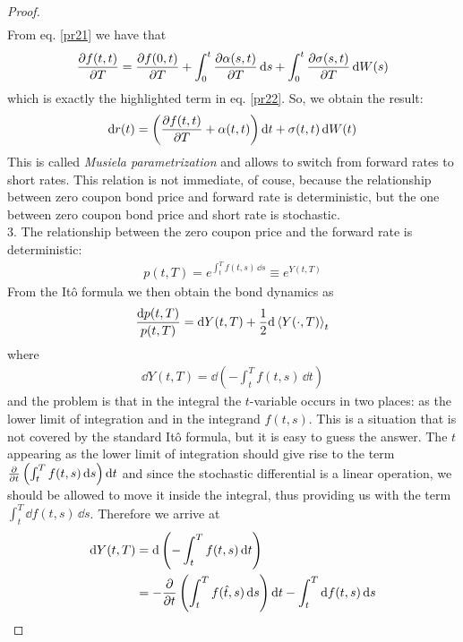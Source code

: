 \begin{proof}
\begin{align*}
    \end{align*}
    From eq. \eqref{pr21} we have that
    \begin{align*}
        \pdv{f(t,t)}{T} = \pdv{f(0,t)}{T} + \int_0^t \pdv{\alpha(s,t)}{T}\,\dd s + \int_0^t \pdv{\sigma(s,t)}{T}\,\dd W(s)
    \end{align*}
    which is exactly the highlighted term in eq. \eqref{pr22}. So, we obtain the result:
    \begin{align*}
        \dd r(t) = \left(\pdv{f(t,t)}{T} + \alpha(t,t)\right)\dd t + \sigma(t,t)\,\dd W(t)
    \end{align*}
    This is called \emph{Musiela parametrization} and allows to switch from forward rates to short rates. This relation is not immediate, of couse, because the relationship between zero coupon bond price and forward rate is deterministic, but the one between zero coupon bond price and short rate is stochastic.\\
    3. The relationship between the zero coupon price and the forward rate is deterministic:
    \begin{align*}
        p(t,T) = e^{\int_t^T f(t,s)\,\dd s} \equiv e^{Y(t,T)}
    \end{align*}
    From the Itô formula we then obtain the bond dynamics as
    \begin{align*}
        \frac{\dd p(t,T)}{p(t,T)} = \dd Y(t,T) + \frac{1}{2}\dd \expval{Y(\cdot, T)}_t
    \end{align*}
    where
    \begin{align*}
        \dd Y(t,T) = \dd\left(-\int_t^T f(t,s)\,\dd t\right)
    \end{align*}
    and the problem is that in the integral the $t$-variable occurs in two places: as the lower limit of integration and in the integrand $f(t, s)$. This is a situation that is not covered by the standard Itô formula, but it is easy to guess the answer. The $t$ appearing as the lower limit of integration should give rise to the term $\pdv{}{t}\left(\int_t^T f(t,s)\,\dd s\right)\dd t$ and since the stochastic differential is a linear operation, we should be allowed to move it inside the integral, thus providing us with the term $\int_t^T \dd f(t,s)\,\dd s$. Therefore we arrive at
    \begin{align*}
        \dd Y(t,T) &= \dd\left(-\int_t^T f(t,s)\,\dd t\right) \\
        &=
        -\pdv{}{t}\left(\int_t^T f(\hat{t},s)\,\dd s\right)\dd t - \int_t^T \dd f(t,s)\,\dd s \\ %

\end{align*}
\end{proof}
